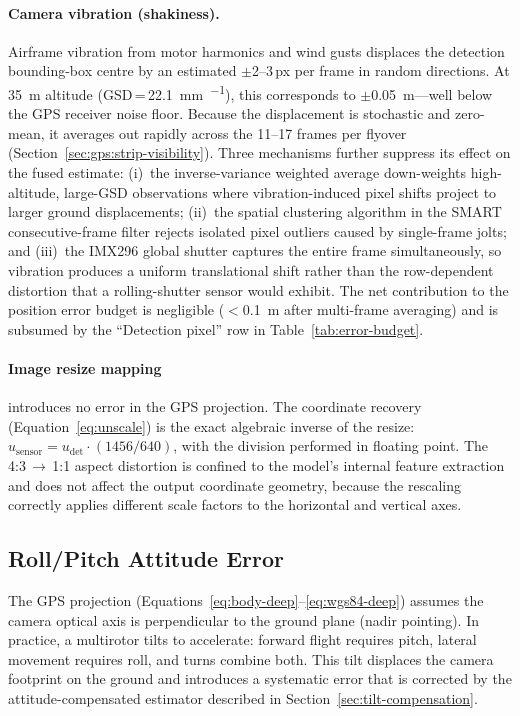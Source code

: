 \paragraph{Camera vibration (shakiness).}  Airframe vibration from motor harmonics and wind gusts displaces the detection bounding-box centre by an estimated $\pm$2--3\,px per frame in random directions.  At \SI{35}{\metre} altitude (GSD\,=\,\SI{22.1}{\milli\metre\per\px}), this corresponds to $\pm$\SI{0.05}{\metre}---well below the GPS receiver noise floor.  Because the displacement is stochastic and zero-mean, it averages out rapidly across the 11--17 frames per flyover (Section~\ref{sec:gps:strip-visibility}).  Three mechanisms further suppress its effect on the fused estimate: (i)~the inverse-variance weighted average down-weights high-altitude, large-GSD observations where vibration-induced pixel shifts project to larger ground displacements; (ii)~the spatial clustering algorithm in the SMART consecutive-frame filter rejects isolated pixel outliers caused by single-frame jolts; and (iii)~the IMX296 global shutter captures the entire frame simultaneously, so vibration produces a uniform translational shift rather than the row-dependent distortion that a rolling-shutter sensor would exhibit.  The net contribution to the position error budget is negligible ($<$\SI{0.1}{\metre} after multi-frame averaging) and is subsumed by the ``Detection pixel'' row in Table~\ref{tab:error-budget}.

\paragraph{Image resize mapping} introduces no error in the GPS projection.  The coordinate recovery (Equation~\ref{eq:unscale}) is the exact algebraic inverse of the resize: $u_\mathrm{sensor} = u_\mathrm{det} \cdot (1456/640)$, with the division performed in floating point.  The 4:3\,$\to$\,1:1 aspect distortion is confined to the model's internal feature extraction and does not affect the output coordinate geometry, because the rescaling correctly applies different scale factors to the horizontal and vertical axes.

\subsection{Roll/Pitch Attitude Error}\label{sec:roll-pitch-analysis}

The GPS projection (Equations~\ref{eq:body-deep}--\ref{eq:wgs84-deep}) assumes the camera optical axis is perpendicular to the ground plane (nadir pointing).  In practice, a multirotor tilts to accelerate: forward flight requires pitch, lateral movement requires roll, and turns combine both.  This tilt displaces the camera footprint on the ground and introduces a systematic error that is corrected by the attitude-compensated estimator described in Section~\ref{sec:tilt-compensation}.

